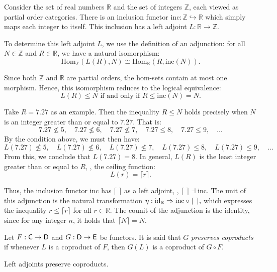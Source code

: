\begin{example}
  Consider the set of real numbers $\mathbb{R}$ and the set of integers $\mathbb{Z}$, each viewed as partial order categories. There is an inclusion functor $\mathrm{inc} : \mathbb{Z} \hookrightarrow \mathbb{R}$ which simply maps each integer to itself.  This inclusion has a left adjoint $L : \mathbb{R} \to \mathbb{Z}$. 

To determine this left adjoint $L$, we use the definition of an adjunction:  for all $N \in \mathbb{Z}$ and $R \in \mathbb{R}$, we have a natural isomorphism:
\[
\mathrm{Hom}_{\mathbb{Z}}(L(R), N) \cong \mathrm{Hom}_{\mathbb{R}}(R, \mathrm{inc}(N)).
\]

Since both $\mathbb{Z}$ and $\mathbb{R}$ are partial orders, the hom-sets contain at most one morphism. Hence, this isomorphism reduces to the logical equivalence:
\[
 L(R) \leq N \text{ if and only if } R \leq \mathrm{inc}(N) = N.
\]

Take $R = 7.27$ as an example. Then the inequality $R \leq N$ holds precisely when $N$ is an integer greater than or equal to $7.27$. That is:
\[
7.27 \nleq 5,\quad 7.27 \nleq 6,\quad 7.27 \nleq 7,\quad 7.27 \leq 8,\quad 7.27 \leq 9, \quad \ldots
\]
By the condition above, we must then have:
\[
L(7.27) \nleq 5,\quad L(7.27) \nleq 6,\quad L(7.27) \nleq 7,\quad L(7.27) \leq 8,\quad L(7.27) \leq 9, \quad \ldots
\]
From this, we conclude that $L(7.27) = 8$. In general, $L(R)$ is the least integer greater than or equal to $R$, \ie, the ceiling function:
\[
L(r) = \lceil r \rceil.
\]

Thus, the inclusion functor $\mathrm{inc}$ has $\lceil \; \rceil$ as a left adjoint, \ie, $\lceil  \; \rceil \dashv \mathrm{inc}$.
The unit of this adjunction is the natural transformation
$\eta : \mathrm{id}_{\mathbb{R}} \Rightarrow \mathrm{inc} \circ \lceil  \;  \rceil,$
which expresses the inequality $r \leq \lceil r \rceil$ for all $r \in \mathbb{R}$. The counit of the adjunction is the identity, since for any integer $n$, it holds that $\lceil N \rceil = N$.
\end{example}



\begin{definition}
  Let \( F: \mathsf{C} \to \mathsf{D} \) and \( G:  \mathsf{D} \to  \mathsf{E} \) be functors. It is said that \( G \)  \emph{preserves coproducts} if  whenever $ L $ is a coproduct of \( F \), then \( G(L) \) is a coproduct of \( G \circ F \).
\end{definition}

\begin{theorem} \cite[Section 4.6]{yanofskyMonoidalCategoryTheory2024}
 Left adjoints preserve coproducts.
\end{theorem}

